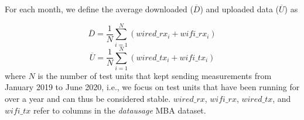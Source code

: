 \documentclass[conference,10pt]{IEEEtran}
\begin{document}
For each month, we define the average downloaded ($\overline{D}$) and uploaded data ($\overline{U}$) as

\begin{equation}
    \overline{D} = \frac{1}{N} \sum_{i=1}^{N} (wired\_rx_i + wifi\_rx_i)
\end{equation}
\begin{equation}
    \overline{U} = \frac{1}{N} \sum_{i=1}^{N} (wired\_tx_i + wifi\_tx_i)
\end{equation}
where $N$ is the number of test units that kept sending measurements from January 2019 to June 2020, i.e., we focus on test units that have been running for over a year and can thus be considered stable. $wired\_rx$, $wifi\_rx$, $wired\_tx$, and $wifi\_tx$ refer to columns in the \textit{datausage} \gls{MBA} dataset.







\end{document}

